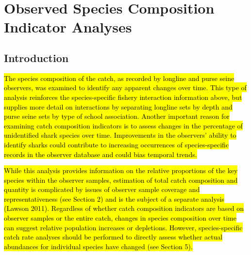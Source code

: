 \documentclass[12pt]{SCreport}
\begin{document}
      
      
\section{Observed Species Composition Indicator Analyses}

 \subsection{Introduction}
\hl{The species composition of the catch, as recorded by longline and purse seine observers, was examined to identify any apparent changes over time. This type of analysis reinforces the species-specific fishery interaction information above, but supplies more detail on interactions by separating longline sets by depth and purse seine sets by type of school association. Another important reason for examining catch composition indicators is to assess changes in the percentage of unidentified shark species over time. Improvements in the observers' ability to identify sharks could contribute to increasing occurrences of species-specific records in the observer database and could bias temporal trends.}

\hl{While this analysis provides information on the relative proportions of the key species within the observer samples, estimation of total catch composition and quantity is complicated by issues of observer sample coverage and representativeness (see Section 2) and is the subject of a separate analysis (Lawson 2011). Regardless of whether catch composition indicators are based on observer samples or the entire catch, changes in species composition over time can suggest relative population increases or depletions. However, species-specific catch rate analyses should be performed to directly assess whether actual abundances for individual species have changed (see Section 5).}
     
      
\end{document}
